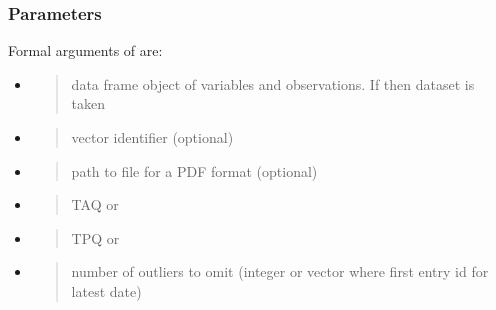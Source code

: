 \documentclass[a4paper,12pt,english]{sphinxhowto}
\begin{document}


\subsubsection{Parameters}
\label{\detokenize{Time:parameters}}
Formal arguments of  are:
\begin{itemize}
\item {} 
\begin{quote}

data frame object of variables and observations. If  then  dataset is taken
\end{quote}

\item {} 
\begin{quote}

vector identifier (optional)
\end{quote}

\item {} 
\begin{quote}

path to file for a PDF format (optional)
\end{quote}

\item {} 
\begin{quote}

TAQ or 
\end{quote}

\item {} 
\begin{quote}

TPQ or 
\end{quote}

\item {} 
\begin{quote}

number of outliers to omit (integer or vector where first entry id for latest date)
\end{quote}

\end{itemize}
\end{document}

